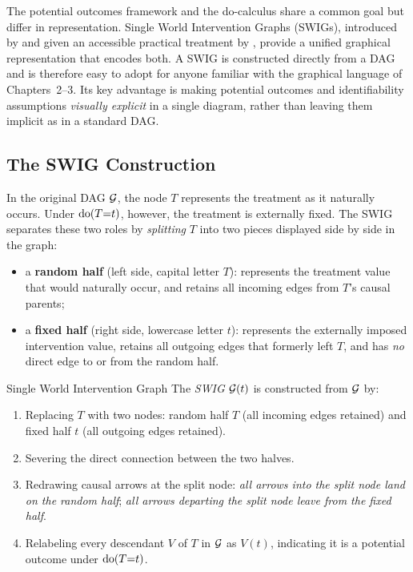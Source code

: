 \documentclass[master.tex]{subfiles}
\begin{document}
The potential outcomes framework and the do-calculus share a common goal
but differ in representation.  Single World Intervention Graphs (SWIGs),
introduced by \citet{richardson2014ace} and given an accessible practical
treatment by \citet{bezuidenhout2025swigs}, provide a unified graphical
representation that encodes both.  A SWIG is constructed directly from a
DAG and is therefore easy to adopt for anyone familiar with the graphical
language of Chapters~2--3.  Its key advantage is making potential outcomes
and identifiability assumptions \emph{visually explicit} in a single
diagram, rather than leaving them implicit as in a standard DAG.

\subsection{The SWIG Construction}
\label{w4:subsec:swig-def}

In the original DAG $\mathcal{G}$, the node $T$ represents the treatment as it
naturally occurs.  Under $\mathrm{do}(T{=}t)$, however, the treatment is
externally fixed.  The SWIG separates these two roles by \emph{splitting}
$T$ into two pieces displayed side by side in the graph:
\begin{itemize}
  \item a \textbf{random half} (left side, capital letter $T$): represents
        the treatment value that would naturally occur, and retains all
        incoming edges from $T$'s causal parents;
  \item a \textbf{fixed half} (right side, lowercase letter $t$): represents
        the externally imposed intervention value, retains all outgoing
        edges that formerly left $T$, and has \emph{no} direct edge to or
        from the random half.
\end{itemize}

\begin{defn}{Single World Intervention Graph \citep{richardson2014ace}}
\label{w4:defn:swig}
The \emph{SWIG} $\mathcal{G}(t)$ is constructed from $\mathcal{G}$ by:
\begin{enumerate}
  \item Replacing $T$ with two nodes: random half $T$ (all incoming edges
        retained) and fixed half $t$ (all outgoing edges retained).
  \item Severing the direct connection between the two halves.
  \item Redrawing causal arrows at the split node:
        \emph{all arrows into the split node land on the random half};
        \emph{all arrows departing the split node leave from the fixed half}.
  \item Relabeling every descendant $V$ of $T$ in $\mathcal{G}$ as $V(t)$,
        indicating it is a potential outcome under $\mathrm{do}(T{=}t)$.
\end{enumerate}
\end{defn}
\end{document}

